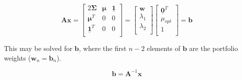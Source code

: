 \documentclass{article}[11pt]
\begin{document}
\begin{equation}
\mathbf{A}\mathbf{x} =
\left[ \begin{array}{ccc}
2 \mathbf{\Sigma}         & \mathbf{\mu} & \mathbf{\underline{1}} \\
\mathbf{\mu}^T            & 0            & 0                      \\
\mathbf{\underline{1}}^T  & 0            & 0                      \\
\end{array} \right]
=
\left[ \begin{array}{c}
\mathbf{w} \\
\lambda_1  \\
\lambda_2  \\
\end{array} \right]
\left[ \begin{array}{c}
\mathbf{\underline{0}}^T \\
\mu_{opt}  \\
1  \\
\end{array} \right]
= \mathbf{b}
\label{eq:lineq_expand}
\end{equation}

This may be solved for $\mathbf{b}$, where the first $n-2$ elements of $\mathbf{b}$ are the portfolio weights ($\mathbf{w}_{n} = \mathbf{b}_{n}$).

\begin{equation}
\mathbf{b} = \mathbf{A}^{-1} \mathbf{x}
\label{eq:lineq_mat}
\end{equation}








\end{document}
